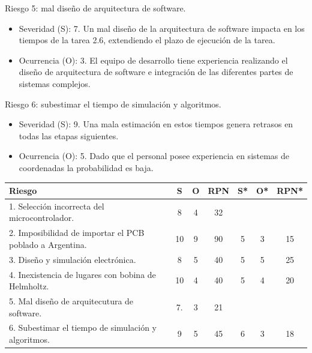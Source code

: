 \documentclass[
11pt, %
]{charter}
\begin{document}
Riesgo 5:  mal diseño de arquitectura de software.
\begin{itemize}
	\item Severidad (S): 7.
	\newline 
	Un mal diseño de la arquitectura de software impacta en los tiempos de la tarea 2.6, extendiendo el plazo de ejecución de la tarea.  
	\item Ocurrencia (O): 3.
	\newline 
	El equipo de desarrollo tiene experiencia realizando el diseño de arquitectura de software e integración de las diferentes partes de sistemas complejos. 
\end{itemize}



Riesgo 6:  subestimar el tiempo de simulación y algoritmos.
\begin{itemize}
	\item Severidad (S): 9.
	\newline Una mala estimación en estos tiempos 
	genera retrasos en todas las etapas siguientes. 
	\item Ocurrencia (O): 5.\newline 
	Dado que el personal posee experiencia en sistemas de coordenadas la probabilidad es baja. 
\end{itemize}






\begin{table}[htpb]
\centering



\begin{tabularx}{\linewidth}{@{}|X|c|c|c|c|c|c|@{}}
\hline
\rowcolor[HTML]{C0C0C0} 
Riesgo  & S  & O & RPN & S* & O* & RPN* \\ \hline
     1. Selección incorrecta del microcontrolador. & 8  & 4 & 32  &    &    &      \\ \hline
     2. Imposibilidad de importar el PCB poblado a Argentina. & 10 & 9 & 90  &  5  & 3   & 15     \\ \hline
     3. Diseño y simulación electrónica. & 8  & 5 & 40  &  5  & 5   & 25     \\ \hline
     4. Inexistencia de lugares con bobina de Helmholtz.& 10 & 4 & 40  &  5  & 4   & 20     \\ \hline
     5. Mal diseño de arquitecutura de software. & 7.  & 3 & 21  &     &     &      \\ \hline
     6. Subestimar el tiempo de simulación y algoritmos. & 9  & 5 & 45  &  6  & 3   & 18     \\ \hline

\end{tabularx}
\end{table}
\end{document}
